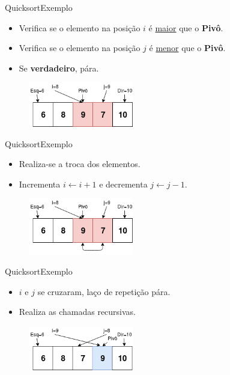 \documentclass[aspectratio=169]{beamer}
\begin{document}
\begin{frame}{Quicksort}{Exemplo}
\begin{itemize}
 \item Verifica se o elemento na posição $i$ é \underline{maior} que o {\bf Pivô}.
 \item Verifica se o elemento na posição $j$ é \underline{menor} que o {\bf Pivô}.
 \item Se {\bf verdadeiro}, pára.
\end{itemize}

\begin{figure}[!h]
  \centering
  \includegraphics[width=130pt]{imgs/quick/quick33.png}
  \label{fig_quick33}
\end{figure}

\end{frame}


\begin{frame}{Quicksort}{Exemplo}
\begin{itemize}
 \item Realiza-se a troca dos elementos.
 \item Incrementa $i\leftarrow i + 1$ e decrementa $j \leftarrow j - 1$.
\end{itemize}

\begin{figure}[!h]
  \centering
  \includegraphics[width=130pt]{imgs/quick/quick34.png}
  \label{fig_quick34}
\end{figure}

\end{frame}


\begin{frame}{Quicksort}{Exemplo}
\begin{itemize}
 \item $i$ e $j$ se cruzaram, laço de repetição pára.
 \item Realiza as chamadas recursivas.
\end{itemize}

\begin{figure}[!h]
  \centering
  \includegraphics[width=130pt]{imgs/quick/quick35.png}
  \label{fig_quick35}
\end{figure}

\end{frame}
\end{document}
